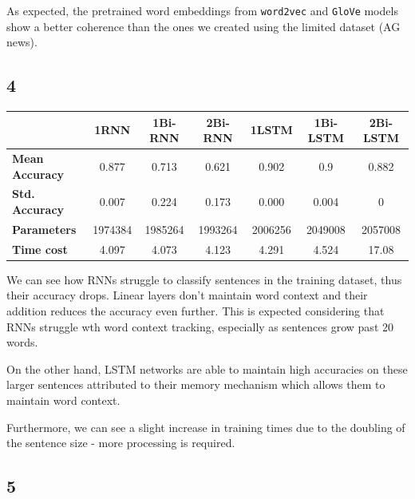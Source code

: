 \documentclass[8pt,a4paper]{report}%
\begin{document}
As expected, the pretrained word embeddings from \lstinline{word2vec} and \lstinline{GloVe} models show a better coherence than the ones we created using the limited dataset (AG news).

\subsection*{4}

\begin{table}[H]
\begin{tabular}{|l|c|c|c|c|c|c|}
\hline
\multicolumn{1}{|c|}{\textbf{}} & \textbf{1RNN} & \textbf{1Bi-RNN} & \textbf{2Bi-RNN} & \textbf{1LSTM} & \textbf{1Bi-LSTM} & \textbf{2Bi-LSTM} \\ \hline
\textbf{Mean Accuracy}          & 0.877         & 0.713            & 0.621            & 0.902          & 0.9               & 0.882             \\ \hline
\textbf{Std. Accuracy}          & 0.007         & 0.224            & 0.173            & 0.000          & 0.004             & 0                 \\ \hline
\textbf{Parameters}             & 1974384       & 1985264          & 1993264          & 2006256        & 2049008           & 2057008           \\ \hline
\textbf{Time cost}              & 4.097         & 4.073            & 4.123            & 4.291          & 4.524             & 17.08             \\ \hline
\end{tabular}
\end{table}

We can see how RNNs struggle to classify sentences in the training dataset, thus their accuracy drops. Linear layers don't maintain word context and their addition reduces the accuracy even further. This is expected considering that RNNs struggle wth word context tracking, especially as sentences grow past 20 words.

On the other hand, LSTM networks are able to maintain high accuracies on these larger sentences attributed to their memory mechanism which allows them to maintain word context.

Furthermore, we can see a slight increase in training times due to the doubling of the sentence size - more processing is required.


\subsection*{5}
\end{document}
